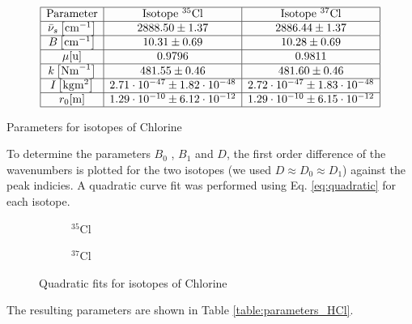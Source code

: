 \documentclass{article}
\begin{document}
\begin{table}[H]
    \centering
    \[
    \begin{array}{|c|c|c|}
    \hline \text{Parameter} & \text{Isotope }{ }^{35} \mathrm{Cl} & \text{Isotope }{ }^{37} \mathrm{Cl} \\
    \hline \bar{\nu}_s\left[\mathrm{cm}^{-1}\right] & 2888.50 \pm 1.37 & 2886.44 \pm 1.37 \\
    \hline B\left[\mathrm{cm}^{-1}\right] & 10.31 \pm 0.69 & 10.28 \pm 0.69 \\
    \hline \mu[\mathrm{u}] & 0.9796 & 0.9811 \\
    \hline k\left[\mathrm{Nm}^{-1}\right] & 481.55 \pm 0.46 & 481.60 \pm 0.46 \\
    \hline I\left[\mathrm{kg} \mathrm{m}^2\right] & 2.71 \cdot 10^{-47} \pm 1.82 \cdot 10^{-48} & 2.72 \cdot 10^{-47} \pm 1.83 \cdot 10^{-48} \\
    \hline r_0[\mathrm{m}] & 1.29 \cdot 10^{-10} \pm 6.12 \cdot 10^{-12} & 1.29 \cdot 10^{-10} \pm 6.15 \cdot 10^{-12} \\
    \hline
    \end{array}
    \]
    \caption{Parameters for isotopes of Chlorine}
    \label{table:parameters}
\end{table}

To determine the parameters $B_0$ , $B_1$ and $D$, the first order difference of the wavenumbers is plotted for the two isotopes (we used $D \approx D_0 \approx D_1$) against the peak indicies. A quadratic curve fit was performed using Eq. \ref{eq:quadratic} for each isotope.

\begin{figure}[H]
	\centering
	\begin{subfigure}{0.45\textwidth}
		\centering
		\scalebox{0.50}{}
		\caption{$^{35}$Cl}
		\label{fig:Quadratic_fit_Cl35}
	\end{subfigure}
	\hspace{0.5cm}
	\begin{subfigure}{0.45\textwidth}
		\centering
		\scalebox{0.50}{}
		\caption{$^{37}$Cl}
		\label{fig:Quadratic_fit_Cl37}
	\end{subfigure}
	\caption{Quadratic fits for isotopes of Chlorine}
\end{figure}

The resulting parameters are shown in Table \ref{table:parameters_HCl}.
\end{document}
